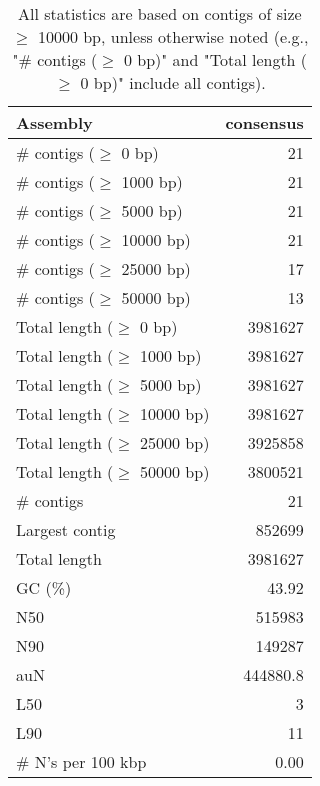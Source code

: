 \documentclass[12pt,a4paper]{article}
\begin{document}
\begin{table}[ht]
\begin{center}
\caption{All statistics are based on contigs of size $\geq$ 10000 bp, unless otherwise noted (e.g., "\# contigs ($\geq$ 0 bp)" and "Total length ($\geq$ 0 bp)" include all contigs).}
\begin{tabular}{|l*{1}{|r}|}
\hline
Assembly & consensus \\ \hline
\# contigs ($\geq$ 0 bp) & 21 \\ \hline
\# contigs ($\geq$ 1000 bp) & 21 \\ \hline
\# contigs ($\geq$ 5000 bp) & 21 \\ \hline
\# contigs ($\geq$ 10000 bp) & 21 \\ \hline
\# contigs ($\geq$ 25000 bp) & 17 \\ \hline
\# contigs ($\geq$ 50000 bp) & 13 \\ \hline
Total length ($\geq$ 0 bp) & 3981627 \\ \hline
Total length ($\geq$ 1000 bp) & 3981627 \\ \hline
Total length ($\geq$ 5000 bp) & 3981627 \\ \hline
Total length ($\geq$ 10000 bp) & 3981627 \\ \hline
Total length ($\geq$ 25000 bp) & 3925858 \\ \hline
Total length ($\geq$ 50000 bp) & 3800521 \\ \hline
\# contigs & 21 \\ \hline
Largest contig & 852699 \\ \hline
Total length & 3981627 \\ \hline
GC (\%) & 43.92 \\ \hline
N50 & 515983 \\ \hline
N90 & 149287 \\ \hline
auN & 444880.8 \\ \hline
L50 & 3 \\ \hline
L90 & 11 \\ \hline
\# N's per 100 kbp & 0.00 \\ \hline
\end{tabular}
\end{center}
\end{table}
\end{document}
